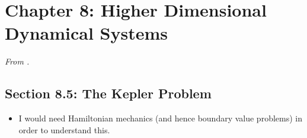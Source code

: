 \documentclass[../notes.tex]{subfiles}
\begin{document}
\section{Chapter 8: Higher Dimensional Dynamical Systems}
\emph{From \textcite{bib:Teschl}.}
\subsection*{Section 8.5: The Kepler Problem}
\begin{itemize}
    \item {}I would need Hamiltonian mechanics (and hence boundary value problems) in order to understand this.
\end{itemize}
\end{document}
